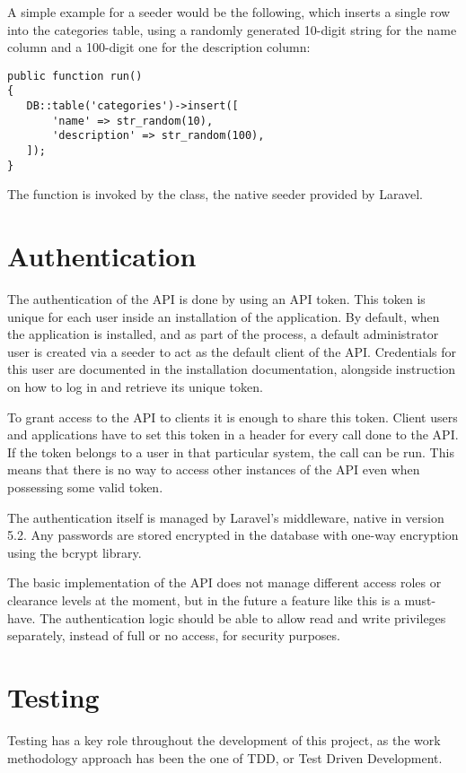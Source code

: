 A simple example for a seeder would be the following, which inserts a single row into the categories table, using a randomly generated 10-digit string for the name column and a 100-digit one for the description column:

\begin{verbatim}
public function run()
{
   DB::table('categories')->insert([
       'name' => str_random(10),
       'description' => str_random(100),
   ]);
}
\end{verbatim}

The  function is invoked by the  class, the native seeder provided by Laravel.

\section{Authentication}
The authentication of the API is done by using an API token.  This token is unique for each user inside an installation of the application. By default, when the application is installed, and as part of the process, a default administrator user is created via a seeder to act as the default client of the API. Credentials for this user are documented in the installation documentation, alongside instruction on how to log in and retrieve its unique token.

To grant access to the API to clients it is enough to share this token. Client users and applications have to set this token in a header for every call done to the API. If the token belongs to a user in that particular system, the call can be  run. This means that there is no way to access other instances of the API even when possessing some valid token.

The authentication itself is managed by Laravel’s  middleware, native in version 5.2. Any passwords are stored encrypted in the database with one-way encryption using the bcrypt library.

The basic implementation of the API does not manage different access roles or clearance levels at the moment, but in the future a feature like this is a must-have. The authentication logic should be able to allow read and write privileges separately, instead of full or no access, for security purposes.

\section{Testing}
Testing has a key role throughout the development of this project, as the work methodology approach has been the one of TDD, or Test Driven Development. 

